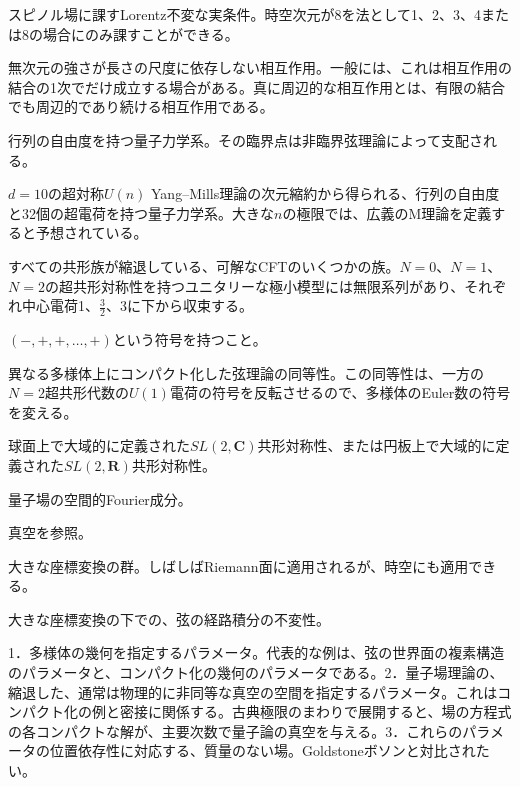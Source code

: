 {スピノル場に課すLorentz不変な実条件。時空次元が8を法として1、2、3、4または8の場合にのみ課すことができる。}

{無次元の強さが長さの尺度に依存しない相互作用。一般には、これは相互作用の結合の1次でだけ成立する場合がある。真に周辺的な相互作用とは、有限の結合でも周辺的であり続ける相互作用である。}

{行列の自由度を持つ量子力学系。その臨界点は非臨界弦理論によって支配される。}

{$d=10$の超対称$U(n)$ Yang--Mills理論の次元縮約から得られる、行列の自由度と32個の超電荷を持つ量子力学系。大きな$n$の極限では、広義のM理論を定義すると予想されている。}

{すべての共形族が縮退している、可解なCFTのいくつかの族。$N=0$、$N=1$、$N=2$の超共形対称性を持つユニタリーな極小模型には無限系列があり、それぞれ中心電荷1、$\frac32$、3に下から収束する。}

{$(-,+,+,\ldots,+)$という符号を持つこと。}

{異なる多様体上にコンパクト化した弦理論の同等性。この同等性は、一方の$N=2$超共形代数の$U(1)$電荷の符号を反転させるので、多様体のEuler数の符号を変える。}

{球面上で大域的に定義された$SL(2,\mathbf C)$共形対称性、または円板上で大域的に定義された$SL(2,\mathbf R)$共形対称性。}

{量子場の空間的Fourier成分。}

{真空を参照。}

{大きな座標変換の群。しばしばRiemann面に適用されるが、時空にも適用できる。}

{大きな座標変換の下での、弦の経路積分の不変性。}

{1．多様体の幾何を指定するパラメータ。代表的な例は、弦の世界面の複素構造のパラメータと、コンパクト化の幾何のパラメータである。2．量子場理論の、縮退した、通常は物理的に非同等な真空の空間を指定するパラメータ。これはコンパクト化の例と密接に関係する。古典極限のまわりで展開すると、場の方程式の各コンパクトな解が、主要次数で量子論の真空を与える。3．これらのパラメータの位置依存性に対応する、質量のない場。Goldstoneボソンと対比されたい。}


